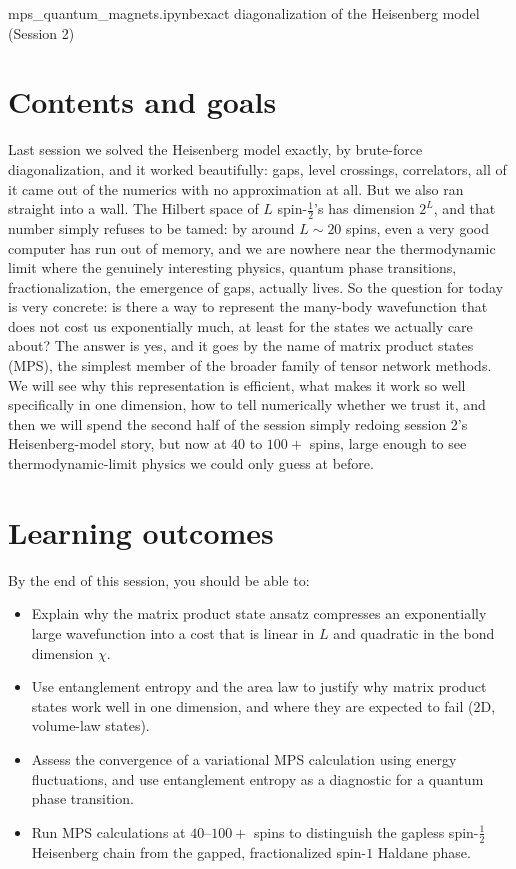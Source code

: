 \documentclass[all_sessions.tex]{subfiles}
\begin{document}
%
  {mps\_quantum\_magnets.ipynb}{exact diagonalization of the Heisenberg model (Session 2)}

\section*{Contents and goals}
Last session we solved the Heisenberg model exactly, by brute-force diagonalization, and it
worked beautifully: gaps, level crossings, correlators, all of it came out of the numerics with
no approximation at all. But we also ran straight into a wall. The Hilbert space of $L$
spin-$\tfrac12$'s has dimension $2^L$, and that number simply refuses to be tamed: by around
$L\sim 20$ spins, even a very good computer has run out of memory, and we are nowhere near the
thermodynamic limit where the genuinely interesting physics, quantum phase transitions,
fractionalization, the emergence of gaps, actually lives. So the question for today is very
concrete: is there a way to represent the many-body wavefunction that does not cost us
exponentially much, at least for the states we actually care about? The answer is yes, and it
goes by the name of matrix product states (MPS), the simplest member of the broader family of
tensor network methods. We will see why this representation is efficient, what makes it work so
well specifically in one dimension, how to tell numerically whether we trust it, and then we will
spend the second half of the session simply redoing session 2's Heisenberg-model story, but now
at $40$ to $100+$ spins, large enough to see thermodynamic-limit physics we could only guess at
before.

\section*{Learning outcomes}
By the end of this session, you should be able to:
\begin{itemize}[nosep]
  \item Explain why the matrix product state ansatz compresses an exponentially large
    wavefunction into a cost that is linear in $L$ and quadratic in the bond dimension $\chi$.
  \item Use entanglement entropy and the area law to justify why matrix product states work well
    in one dimension, and where they are expected to fail (2D, volume-law states).
  \item Assess the convergence of a variational MPS calculation using energy fluctuations, and use
    entanglement entropy as a diagnostic for a quantum phase transition.
  \item Run MPS calculations at $40$--$100+$ spins to distinguish the gapless spin-$\tfrac12$
    Heisenberg chain from the gapped, fractionalized spin-$1$ Haldane phase.
\end{itemize}
\end{document}
